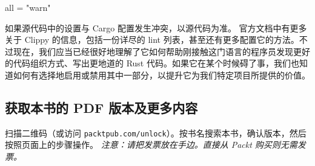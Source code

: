 \begin{codebox}
all = "warn"
\end{codebox}
如果源代码中的设置与 Cargo 配置发生冲突，以源代码为准。
\label{idx:idx_3f8728bf}
官方文档中有更多关于 Clippy 的信息，包括一份详尽的 lint 列表，甚至还有更多配置它的方法。不过现在，我们应当已经很好地理解了它如何帮助刚接触这门语言的程序员发现更好的代码组织方式、写出更地道的 Rust 代码。如果它在某个时候碍了事，我们也知道如何有选择地启用或禁用其中一部分，以提升它为我们特定项目所提供的价值。
\begin{samepage}
\subsection{获取本书的 PDF 版本及更多内容}
扫描二维码（或访问 \texttt{packtpub.\allowbreak{}com/\allowbreak{}unlock}）。按书名搜索本书，确认版本，然后按照页面上的步骤操作。
\emph{注意：请把发票放在手边。直接从 Packt 购买则无需发票。}
\end{samepage}

